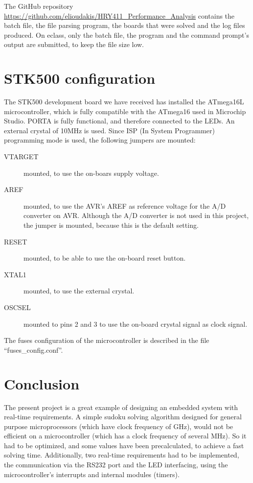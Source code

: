 \documentclass[12pt, a4, hidelinks]{article}
\begin{document}
\noindent The GitHub repository \url{https://github.com/elioudakis/HRY411_Performance_Analysis} contains the batch file, the file parsing program, the boards that were solved and the log files produced. On eclass, only the batch file, the program and the command prompt's output are submitted, to keep the file size low.

\section*{STK500 configuration}
The STK500 development board we have received has installed the ATmega16L microcontroller, which is fully compatible with the ATmega16 used in Microchip Studio. PORTA is fully functional, and therefore connected to the LEDs. An external crystal of 10MHz is used. Since ISP (In System Programmer) programming mode is used, the following jumpers are mounted:
\begin{description}
\item[VTARGET] mounted, to use the on-boars supply voltage.
\item[AREF] mounted, to use the AVR's AREF as reference voltage for the A/D converter on AVR. Although the A/D converter is not used in this project, the jumper is mounted, because this is the default setting.
\item[RESET] mounted, to be able to use the on-board reset button.
\item[XTAL1] mounted, to use the external crystal.
\item[OSCSEL] mounted to pins 2 and 3 to use the on-board crystal signal as clock signal.
\end{description}
The fuses configuration of the microcontroller is described in the file ``fuses\_config.conf''.

\section*{Conclusion}
The present project is a great example of designing an embedded system with real-time requirements. A simple sudoku solving algorithm designed for general purpose microprocessors (which have clock frequency of GHz), would not be efficient on a microcontroller (which has a clock frequency of several MHz). So it had to be optimized, and some values have been precalculated, to achieve a fast solving time. Additionally, two real-time requirements had to be implemented, the communication via the RS232 port and the LED interfacing, using the microcontroller's interrupts and internal modules (timers).
\end{document}
